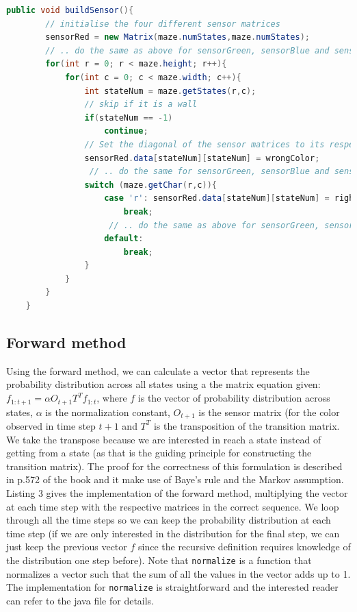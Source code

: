 \documentclass[9.5pt]{extarticle}
\begin{document}
\begin{lstlisting}[language=java,caption={buildSensor}]
	public void buildSensor(){
        // initialise the four different sensor matrices
        sensorRed = new Matrix(maze.numStates,maze.numStates);
        // .. do the same as above for sensorGreen, sensorBlue and sensorYellow
        for(int r = 0; r < maze.height; r++){
            for(int c = 0; c < maze.width; c++){
                int stateNum = maze.getStates(r,c);
                // skip if it is a wall
                if(stateNum == -1)
                    continue;
                // Set the diagonal of the sensor matrices to its respective probability
                sensorRed.data[stateNum][stateNum] = wrongColor;
                 // .. do the same for sensorGreen, sensorBlue and sensorYellow
                switch (maze.getChar(r,c)){
                    case 'r': sensorRed.data[stateNum][stateNum] = rightColor;
                        break;
                     // .. do the same as above for sensorGreen, sensorBlue and sensorYellow
                    default:
                        break;
                }
            }
        }
    }
\end{lstlisting}

\subsection{Forward method}

Using the forward method, we can calculate a vector that represents the probability distribution across all states using a the matrix equation given: $f_{1:t+1} = \alpha O_{t+1}T^{T}f_{1:t}$, where $f$ is the vector of probability distribution across states, $\alpha$ is the normalization constant, $O_{t+1}$ is the sensor matrix (for the color observed in time step $t+1$ and $T^T$ is the transposition of the transition matrix. We take the transpose because we are interested in reach a state instead of getting from a state (as that is the guiding principle for constructing the transition matrix). The proof for the correctness of this formulation is described in p.572 of the book and it make use of Baye's rule and the Markov assumption. Listing 3 gives the implementation of the forward method, multiplying the vector at each time step with the respective matrices in the correct sequence. We loop through all the time steps so we can keep the probability distribution at each time step (if we are only interested in the distribution for the final step, we can just keep the previous vector $f$ since the recursive definition requires knowledge of the distribution one step before). Note that \verb`normalize` is a function that normalizes a vector such that the sum of all the values in the vector adds up to 1. The implementation for \verb`normalize` is straightforward and the interested reader can refer to the java file for details.
\end{document}
